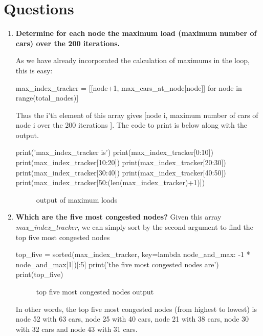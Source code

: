 \documentclass[paper=a4, fontsize=12pt]{scrartcl} %
\numberwithin{equation}{section}       %
\numberwithin{figure}{section}         %
\numberwithin{table}{section}          %
\begin{document}
\section{Questions}
\begin{enumerate}
\item \textbf{Determine for each node the maximum load (maximum number of cars) over the 200 iterations.}
\newline

As we have already incorporated the calculation of maximums in the loop, this is easy:

\begin{python}
max_index_tracker = [[node+1, max_cars_at_node[node]]
                         for node in range(total_nodes)]
\end{python}

Thus the i'th element of this array gives [node i, maximum number of cars of node i over the 200 iterations ]. The code to print is below along with the output.

\begin{python}
print('max_index_tracker is')
print(max_index_tracker[0:10])
print(max_index_tracker[10:20])
print(max_index_tracker[20:30])
print(max_index_tracker[30:40])
print(max_index_tracker[40:50])
print(max_index_tracker[50:(len(max_index_tracker)+1)])
\end{python}

\begin{figure}[h]
\caption{output of maximum loads}
\centering

\end{figure}

\item \textbf{Which are the five most congested nodes?} \newline
Given this array \textit{max\_index\_tracker}, we can simply sort by the second argument to find the top five most congested nodes
\begin{python}
top_five = sorted(max_index_tracker,
                      key=lambda node_and_max: -1 * node_and_max[1])[:5]
print('the five most congested nodes are')
print(top_five)
\end{python}

\begin{figure}[h]
\caption{top five most congested nodes output}
\centering

\end{figure}

In other words, the top five most congested nodes (from highest to lowest) is node 52 with 63 cars, node 25 with 40 cars, node 21 with 38 cars, node 30 with 32 cars and node 43 with 31 cars.
\newline



\end{enumerate}
\end{document}
